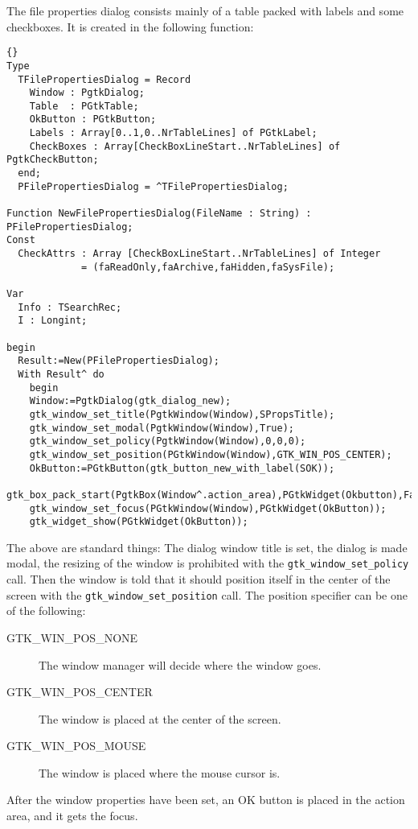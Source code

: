 \documentclass[10pt]{article}
\begin{document}
The file properties dialog consists mainly of a table packed with labels and
some checkboxes. It is created in the following function:
\begin{lstlisting}{}
Type
  TFilePropertiesDialog = Record
    Window : PgtkDialog;
    Table  : PGtkTable;
    OkButton : PGtkButton;
    Labels : Array[0..1,0..NrTableLines] of PGtkLabel;
    CheckBoxes : Array[CheckBoxLineStart..NrTableLines] of PgtkCheckButton;
  end;
  PFilePropertiesDialog = ^TFilePropertiesDialog;
  
Function NewFilePropertiesDialog(FileName : String) : PFilePropertiesDialog;
Const 
  CheckAttrs : Array [CheckBoxLineStart..NrTableLines] of Integer 
             = (faReadOnly,faArchive,faHidden,faSysFile);

Var 
  Info : TSearchRec;
  I : Longint;
  
begin
  Result:=New(PFilePropertiesDialog);
  With Result^ do
    begin
    Window:=PgtkDialog(gtk_dialog_new);
    gtk_window_set_title(PgtkWindow(Window),SPropsTitle);
    gtk_window_set_modal(PgtkWindow(Window),True);
    gtk_window_set_policy(PgtkWindow(Window),0,0,0);
    gtk_window_set_position(PGtkWindow(Window),GTK_WIN_POS_CENTER);
    OkButton:=PGtkButton(gtk_button_new_with_label(SOK));
    gtk_box_pack_start(PgtkBox(Window^.action_area),PGtkWidget(Okbutton),False,False,5);
    gtk_window_set_focus(PGtkWindow(Window),PGtkWidget(OkButton));
    gtk_widget_show(PGtkWidget(OkButton));
\end{lstlisting}
The above are standard things: The dialog window title is set, the dialog is
made modal, the resizing of the window is prohibited with the
\lstinline|gtk_window_set_policy| call. Then the window is told that it
should position itself in the center of the screen with the
\lstinline|gtk_window_set_position| call. The position specifier can be one
of the following:
\begin{description}
\item[GTK\_WIN\_POS\_NONE] The window manager will decide where the window
goes.
\item[GTK\_WIN\_POS\_CENTER] The window is placed at the center of the
screen.
\item[GTK\_WIN\_POS\_MOUSE] The window is placed where the mouse cursor is.
\end{description}
After the window properties have been set, an OK button is placed in the
action area, and it gets the focus.
\end{document}
